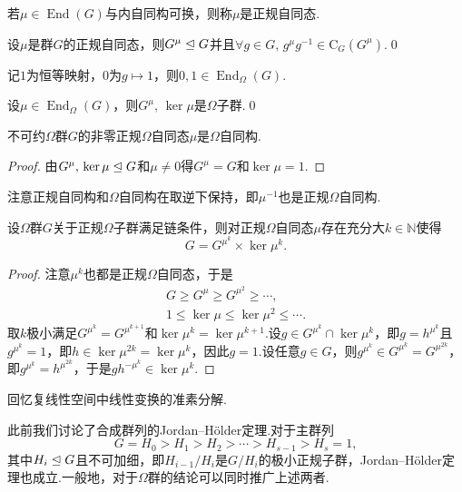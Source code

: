 若$\mu\in\operatorname*{End}(G)$与内自同构可换，则称$\mu$是{\heiti 正规自同态}.

\begin{lemma*}
	设$\mu$是群$G$的正规自同态，则$G^\mu\trianglelefteq G$并且$\forall g\in G,\,g^\mu g^{-1}\in\mathrm{C}_G(G^\mu)$.\qed
\end{lemma*}

记$1$为恒等映射，$0$为$g\mapsto 1$，则$0,1\in\operatorname*{End}_\Omega(G)$.
\begin{prop}
	设$\mu\in\operatorname*{End}_\Omega(G)$，则$G^\mu,\,\ker\mu$是$\Omega$子群.\qed
\end{prop}

\begin{thm}[(Schur)]
	不可约$\Omega$群$G$的非零正规$\Omega$自同态$\mu$是$\Omega$自同构.
\end{thm}
\begin{proof}
	由$G^\mu,\,\ker\mu\trianglelefteq G$和$\mu\ne 0$得$G^\mu=G$和$\ker\mu=1$.
\end{proof}
\begin{remark}
	注意正规自同构和$\Omega$自同构在取逆下保持，即$\mu^{-1}$也是正规$\Omega$自同构.
\end{remark}
\begin{thm}[(Fitting)]
	设$\Omega$群$G$关于正规$\Omega$子群满足链条件，则对正规$\Omega$自同态$\mu$存在充分大$k\in\mathbb{N}$使得
	\[
		G=G^{\mu^k}\times\ker\mu^k.
	\]
\end{thm}
\begin{proof}
	注意$\mu^k$也都是正规$\Omega$自同态，于是
	\begin{gather*}
		G\ge G^\mu\ge G^{\mu^2}\ge\cdots,\\
		1\le\ker\mu\le\ker\mu^2\le\cdots.
	\end{gather*}
	取$k$极小满足$G^{\mu^k}=G^{\mu^{k+1}}$和$\ker\mu^k=\ker\mu^{k+1}$.设$g\in G^{\mu^k}\cap\ker\mu^k$，即$g=h^{\mu^k}$且$g^{\mu^k}=1$，即$h\in\ker\mu^{2k}=\ker\mu^k$，因此$g=1$.设任意$g\in G$，则$g^{\mu^k}\in G^{\mu^k}=G^{\mu^{2k}}$，即$g^{\mu^k}=h^{\mu^{2k}}$，于是$gh^{-\mu^k}\in\ker\mu^k$.
\end{proof}
\begin{remark}
	回忆复线性空间中线性变换的准素分解.
\end{remark}

此前我们讨论了合成群列的Jordan--H\"older定理.对于{\heiti 主群列}
\[
	G=H_0>H_1>H_2>\cdots>H_{s-1}>H_s=1,
\]
其中$H_i\trianglelefteq G$且不可加细，即$H_{i-1}/H_i$是$G/H_i$的极小正规子群，Jordan--H\"older定理也成立.一般地，对于$\Omega$群的结论可以同时推广上述两者.

